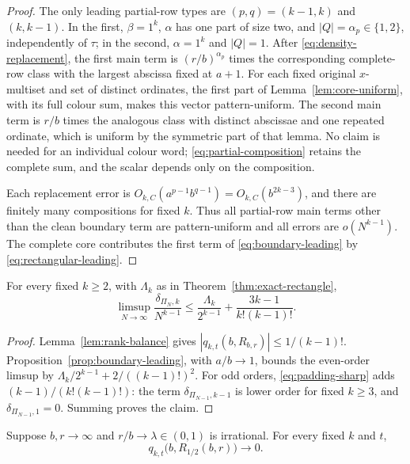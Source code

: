 \begin{proof}
The only leading partial-row types are $(p,q)=(k-1,k)$ and $(k,k-1)$.
In the first, $\beta=1^k$, $\alpha$ has one part of size two, and
$|Q|=\alpha_p\in\{1,2\}$, independently of $\tau$; in the second,
$\alpha=1^k$ and $|Q|=1$.  After
\eqref{eq:density-replacement}, the first main term is
$(r/b)^{\alpha_p}$ times the corresponding complete-row class with the
largest abscissa fixed at $a+1$.  For each fixed original $x$-multiset and
set of distinct ordinates, the first part of Lemma~\ref{lem:core-uniform},
with its full colour sum, makes this vector pattern-uniform.  The second
main term is $r/b$ times the analogous class with distinct abscissae and one
repeated ordinate, which is uniform by the symmetric part of that lemma.  No
claim is needed for an individual colour word; \eqref{eq:partial-composition}
retains the complete sum, and the scalar depends only on the composition.

Each replacement error is
$O_{k,C}(a^{p-1}b^{q-1})=O_{k,C}(b^{2k-3})$, and there are finitely many
compositions for fixed $k$.  Thus all partial-row main terms other than the
clean boundary term are pattern-uniform and all errors are
$o(N^{k-1})$.  The complete core contributes the first term of
\eqref{eq:boundary-leading} by \eqref{eq:rectangular-leading}.
\end{proof}

\begin{corollary}\label{cor:fixed-coefficient}
For every fixed $k\ge2$, with $\Lambda_k$ as in
Theorem~\ref{thm:exact-rectangle},
\[
 \limsup_{N\to\infty}\frac{\delta_{\Pi_N,k}}{N^{k-1}}
 \le\frac{\Lambda_k}{2^{k-1}}+\frac{3k-1}{k!(k-1)!}.
\]
\end{corollary}
\begin{proof}
Lemma~\ref{lem:rank-balance} gives $|q_{k,t}(b,R_{b,r})|\le1/(k-1)!$.
Proposition~\ref{prop:boundary-leading}, with $a/b\to1$, bounds the even-order
limsup by $\Lambda_k/2^{k-1}+2/((k-1)!)^2$.
For odd orders, \eqref{eq:padding-sharp} adds
$(k-1)/(k!(k-1)!)$: the term $\delta_{\Pi_{N-1},k-1}$ is lower order for
fixed $k\ge3$, and $\delta_{\Pi_{N-1},1}=0$. Summing proves the claim.
\end{proof}

\begin{lemma}\label{lem:midpoint-quadrature}
Suppose $b,r\to\infty$ and $r/b\to\lambda\in(0,1)$ is irrational.  For
every fixed $k$ and $t$,
\[
 q_{k,t}\bigl(b,R_{1/2}(b,r)\bigr)\longrightarrow0.
\]
\end{lemma}

